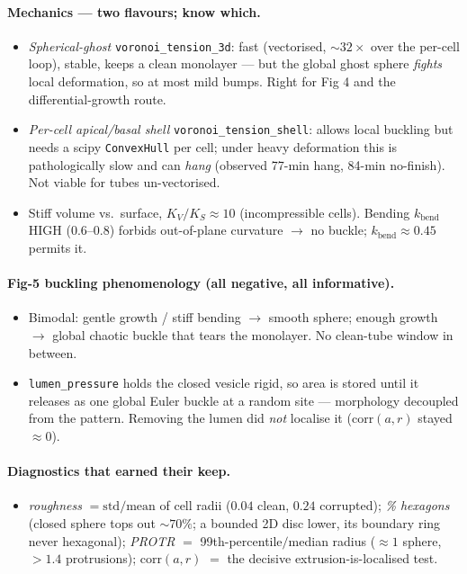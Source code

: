 \documentclass[11pt]{article}
\begin{document}
\paragraph{Mechanics --- two flavours; know which.}
\begin{itemize}\itemsep2pt
\item \emph{Spherical-ghost} \texttt{voronoi\_tension\_3d}: fast (vectorised, $\sim\!32\times$ over
the per-cell loop), stable, keeps a clean monolayer --- but the global ghost sphere \emph{fights}
local deformation, so at most mild bumps. Right for Fig 4 and the differential-growth route.
\item \emph{Per-cell apical/basal shell} \texttt{voronoi\_tension\_shell}: allows local buckling but
needs a scipy \texttt{ConvexHull} per cell; under heavy deformation this is pathologically slow and
can \emph{hang} (observed 77-min hang, 84-min no-finish). Not viable for tubes un-vectorised.
\item Stiff volume vs.\ surface, $K_V/K_S\!\approx\!10$ (incompressible cells). Bending
$k_{\text{bend}}$ HIGH ($0.6$--$0.8$) forbids out-of-plane curvature $\to$ no buckle;
$k_{\text{bend}}\!\approx\!0.45$ permits it.
\end{itemize}

\paragraph{Fig-5 buckling phenomenology (all negative, all informative).}
\begin{itemize}\itemsep2pt
\item Bimodal: gentle growth / stiff bending $\to$ smooth sphere; enough growth $\to$ global chaotic
buckle that tears the monolayer. No clean-tube window in between.
\item \texttt{lumen\_pressure} holds the closed vesicle rigid, so area is stored until it releases as
one global Euler buckle at a random site --- morphology decoupled from the pattern. Removing the
lumen did \emph{not} localise it ($\mathrm{corr}(a,r)$ stayed $\approx\!0$).
\end{itemize}

\paragraph{Diagnostics that earned their keep.}
\begin{itemize}\itemsep2pt
\item \emph{roughness} $=\mathrm{std}/\mathrm{mean}$ of cell radii ($0.04$ clean, $0.24$ corrupted);
\emph{\% hexagons} (closed sphere tops out $\sim\!70\%$; a bounded 2D disc lower, its boundary ring
never hexagonal); \emph{PROTR} $=$ 99th-percentile$/$median radius ($\approx\!1$ sphere, $>\!1.4$
protrusions); \emph{$\mathrm{corr}(a,r)$} $=$ the decisive extrusion-is-localised test.
\end{itemize}
\end{document}
